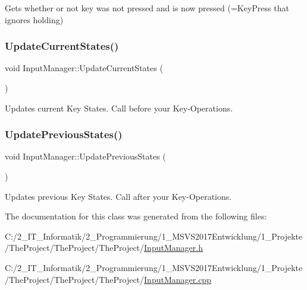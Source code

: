 Gets whether or not key was not pressed and is now pressed (=Key\+Press that ignores holding) 

\mbox{\label{class_input_manager_a93883ab3c8f5bee33e66107515acc3e8}} 
\subsubsection{\texorpdfstring{Update\+Current\+States()}{UpdateCurrentStates()}}
{\footnotesize\ttfamily void Input\+Manager\+::\+Update\+Current\+States (\begin{DoxyParamCaption}{ }\end{DoxyParamCaption})}



Updates current Key States. Call before you\textquotesingle{}r Key-\/\+Operations. 

\mbox{\label{class_input_manager_ac965e4ef52a8a7753c106f2bcae64e21}} 
\subsubsection{\texorpdfstring{Update\+Previous\+States()}{UpdatePreviousStates()}}
{\footnotesize\ttfamily void Input\+Manager\+::\+Update\+Previous\+States (\begin{DoxyParamCaption}{ }\end{DoxyParamCaption})}



Updates previous Key States. Call after you\textquotesingle{}r Key-\/\+Operations. 



The documentation for this class was generated from the following files\+:\begin{DoxyCompactItemize}
\item 
C\+:/2\+\_\+\+I\+T\+\_\+\+Informatik/2\+\_\+\+Programmierung/1\+\_\+\+M\+S\+V\+S2017\+Entwicklung/1\+\_\+\+Projekte/\+The\+Project/\+The\+Project/\+The\+Project/\mbox{\hyperlink{_input_manager_8h}{Input\+Manager.\+h}}\item 
C\+:/2\+\_\+\+I\+T\+\_\+\+Informatik/2\+\_\+\+Programmierung/1\+\_\+\+M\+S\+V\+S2017\+Entwicklung/1\+\_\+\+Projekte/\+The\+Project/\+The\+Project/\+The\+Project/\mbox{\hyperlink{_input_manager_8cpp}{Input\+Manager.\+cpp}}\end{DoxyCompactItemize}
